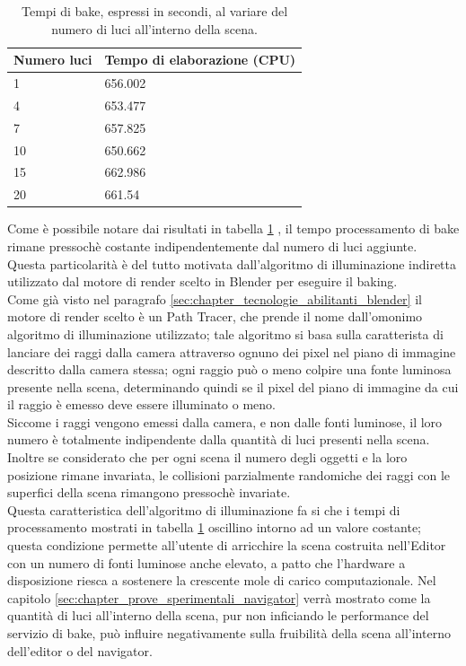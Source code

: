\begin{table}[]
\centering
\caption[Performance al variare delle luci]{Tempi di bake, espressi in secondi, al variare del numero di luci all'interno della scena.}
\begin{tabular}{|l|l|}
\hline
\textbf{Numero luci} & \textbf{Tempo di elaborazione (CPU)} \\ \hline
1 & 656.002 \\ \hline
4 & 653.477 \\ \hline
7 & 657.825 \\ \hline
10 & 650.662 \\ \hline
15 & 662.986 \\ \hline
20 & 661.54 \\ \hline
\end{tabular}
\label{table:per_luci}
\end{table}

Come è possibile notare dai risultati in tabella \ref{table:per_luci} , il tempo processamento di bake rimane pressochè costante indipendentemente dal numero di luci aggiunte. 
\\
Questa particolarità è del tutto motivata dall’algoritmo di illuminazione indiretta utilizzato dal motore di render scelto in Blender per eseguire il baking. 
\\
Come già visto nel paragrafo \ref{sec:chapter_tecnologie_abilitanti_blender} il motore di render scelto è un Path Tracer, che prende il nome dall’omonimo algoritmo di illuminazione utilizzato; tale algoritmo si basa sulla caratterista di lanciare dei raggi dalla camera attraverso ognuno dei pixel nel piano di immagine descritto dalla camera stessa; ogni raggio può o meno colpire una fonte luminosa presente nella scena, determinando quindi se il pixel del piano di immagine da cui il raggio è emesso deve essere illuminato o meno. 
\\
Siccome i raggi vengono emessi dalla camera, e non dalle fonti luminose, il loro numero è totalmente indipendente dalla quantità di luci presenti nella scena. 
\\
Inoltre se considerato che per ogni scena il numero degli oggetti e la loro posizione rimane invariata, le collisioni parzialmente randomiche dei raggi con le superfici della scena rimangono pressochè invariate.
\\ 
Questa caratteristica dell’algoritmo di illuminazione fa si che i tempi di processamento mostrati in tabella \ref{table:per_luci} oscillino intorno ad un valore costante; questa condizione permette all’utente di arricchire la scena costruita nell’Editor con un numero di fonti luminose anche elevato, a patto che l’hardware a disposizione riesca a sostenere la crescente mole di carico computazionale. Nel capitolo \ref{sec:chapter_prove_sperimentali_navigator} verrà mostrato come la quantità di luci all’interno della scena, pur non inficiando le performance del servizio di bake, può influire negativamente sulla fruibilità della scena all’interno dell’editor o del navigator.

